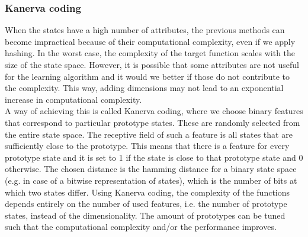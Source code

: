 \documentclass[a4paper]{article}
\begin{document}
\subsubsection{Kanerva coding}
When the states have a high number of attributes, the previous methods can become impractical because of their computational complexity, even if we apply hashing. In the worst case, the complexity of the target function scales with the size of the state space. However, it is possible that some attributes are not useful for the learning algorithm and it would we better if those do not contribute to the complexity. This way, adding dimensions may not lead to an exponential increase in computational complexity.\\
A way of achieving this is called Kanerva coding, where we choose binary features that correspond to particular prototype states. These are randomly selected from the entire state space. The receptive field of such a feature is all states that are sufficiently close to the prototype. This means that there is a feature for every prototype state and it is set to 1 if the state is close to that prototype state and 0 otherwise. The chosen distance is the hamming distance for a binary state space (e.g. in case of a bitwise representation of states), which is the number of bits at which two states differ.
Using Kanerva coding, the complexity of the functions depends entirely on the number of used features, i.e. the number of prototype states, instead of the dimensionality. The amount of prototypes can be tuned such that the computational complexity and/or the performance improves.\\
\end{document}

